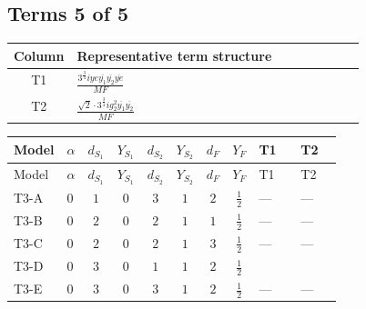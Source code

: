 \documentclass[8pt]{article}
\begin{document}
\begin{landscape}
\subsection*{Terms 5 of 5}
\begin{center}
\begin{tabular}{@{}c >{\raggedright\arraybackslash}p{0.82\linewidth}@{}}
\toprule
Column & Representative term structure \\
\midrule
T1 & \(\displaystyle \frac{3^{\frac{3}{4}} i ye \overline{y_{1}} \overline{y_{2}} \overline{ye}}{MF}\) \\
\midrule
T2 & \(\displaystyle \frac{\sqrt{2} \cdot 3^{\frac{3}{4}} i g_{2}^{2} \overline{y_{1}} \overline{y_{2}}}{MF}\) \\
\midrule
\bottomrule
\end{tabular}
\end{center}
\smallskip
\tiny
\begin{longtable}{@{}llcccccc >{\raggedright\arraybackslash}p{0.21\linewidth} >{\raggedright\arraybackslash}p{0.21\linewidth}@{}}
\toprule
Model & $\alpha$ & $d_{S_1}$ & $Y_{S_1}$ & $d_{S_2}$ & $Y_{S_2}$ & $d_F$ & $Y_F$ & T1 & T2 \\
\midrule
\endfirsthead
\toprule
Model & $\alpha$ & $d_{S_1}$ & $Y_{S_1}$ & $d_{S_2}$ & $Y_{S_2}$ & $d_F$ & $Y_F$ & T1 & T2 \\
\midrule
\endhead
T3-A & $0$ & $1$ & $0$ & $3$ & $1$ & $2$ & $\frac{1}{2}$ & --- & --- \\
\midrule
T3-B & $0$ & $2$ & $0$ & $2$ & $1$ & $1$ & $\frac{1}{2}$ & --- & --- \\
\midrule
T3-C & $0$ & $2$ & $0$ & $2$ & $1$ & $3$ & $\frac{1}{2}$ & --- & --- \\
\midrule
T3-D & $0$ & $3$ & $0$ & $1$ & $1$ & $2$ & $\frac{1}{2}$ & \scriptsize\adjustbox{max width=\linewidth}{$\begin{gathered} - \frac{3^{\frac{3}{4}} i ye \overline{y_{1}} \overline{y_{2}} \overline{ye}}{12 MF}\end{gathered}$} & \scriptsize\adjustbox{max width=\linewidth}{$\begin{gathered} \frac{\sqrt{2} \cdot 3^{\frac{3}{4}} i g_{2}^{2} \overline{y_{1}} \overline{y_{2}}}{6 MF}\end{gathered}$} \\
\midrule
T3-E & $0$ & $3$ & $0$ & $3$ & $1$ & $2$ & $\frac{1}{2}$ & --- & --- \\
\midrule
\bottomrule
\end{longtable}
\clearpage

\end{landscape}
\end{document}
